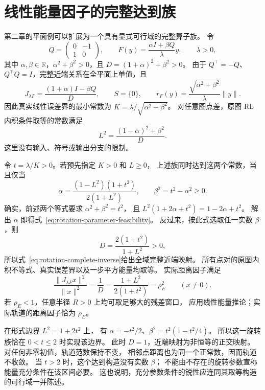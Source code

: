 \section{线性能量因子的完整达到族}
\label{app:linear-attainment}

第二章的平面例可以扩展为一个具有显式可行域的完整算子族。
令
\[
 Q=\begin{pmatrix}0&-1\\1&0\end{pmatrix},\qquad
 F(y)=\frac{\alpha I+\beta Q}{\lambda}y,
 \qquad \lambda>0,
\]
其中 $\alpha,\beta\in\mathbb R$，$\alpha^2+\beta^2>0$，且
$D=(1+\alpha)^2+\beta^2>0$。
由于 $Q^\top=-Q$、$Q^\top Q=I$，完整近端关系在全平面上单值，且
\begin{equation}
\label{eq:rotation-complete-inverse}
 J_{\lambda F}=\frac{(1+\alpha)I-\beta Q}{D},\qquad
 S=\{0\},\qquad
 r_F(y)=\frac{\sqrt{\alpha^2+\beta^2}}\lambda\|y\|.
\end{equation}
因此真实线性误差界的最小常数为
$K=\lambda/\sqrt{\alpha^2+\beta^2}$。
对任意图点差，原图 RL 内积条件取等的常数满足
\[
 L^2=\frac{(1-\alpha)^2+\beta^2}{D}.
\]
这里没有输入、符号或输出分支的限制。

令 $t=\lambda/K>0$。若预先指定 $K>0$ 和 $L\ge0$，
上述族同时达到这两个常数，当且仅当
\begin{equation}
\label{eq:rotation-parameter-feasibility}
 \alpha=\frac{(1-L^2)(1+t^2)}{2(1+L^2)},\qquad
 \beta^2=t^2-\alpha^2\ge0.
\end{equation}
确实，前述两个等式要求 $\alpha^2+\beta^2=t^2$，
且 $L^2(1+2\alpha+t^2)=1-2\alpha+t^2$。
解出 $\alpha$ 即得式~\eqref{eq:rotation-parameter-feasibility}。
反过来，按此式选取任一实数 $\beta$，则
\[
 D=\frac{2(1+t^2)}{1+L^2}>0,
\]
所以式~\eqref{eq:rotation-complete-inverse}给出全域完整近端映射。
所有点对的原图内积不等式、真实误差界以及一步平方能量均取等。
实际距离因子满足
\[
 \frac{\|J_{\lambda F}x\|^2}{\|x\|^2}
 =\frac1D
 =\frac{1+L^2}{2(1+t^2)}=\rho_E^2\qquad(x\ne0).
\]
若 $\rho_E<1$，任意半径 $R>0$ 上均可取足够大的残差窗口，
应用线性能量推论；实际轨道的距离因子恰为 $\rho_E$。

在形式边界 $L^2=1+2t^2$ 上，
有 $\alpha=-t^2/2$、$\beta^2=t^2(1-t^2/4)$。
所以这一旋转族恰在 $0<t\le2$ 时实现该边界。
此时 $D=1$，近端映射为非恒等的正交映射。
对任何非零初值，轨道范数保持不变，
相邻点距离也为同一个正常数，因而轨道不收敛。
当 $t>2$ 时，这个达到构造没有实数 $\beta$；
不能由不存在的旋转参数宣称能量充分条件在该区间必要。
这也说明，充分参数条件的锐性应连同其取等构造的可行域一并陈述。
